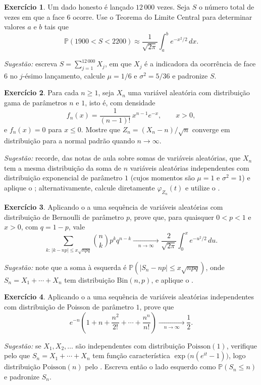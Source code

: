 \documentclass[12pt,portuguese]{article}
\theoremstyle{definition}
\theoremstyle{plainexercise}
\newtheorem{exercise}{Exercício}
\theoremstyle{starredexercise}
\theoremstyle{definition}
\begin{document}
\begin{exercise}\label{exercise:gw-8-32}
Um dado honesto é lançado $12\,000$ vezes. Seja $S$ o número total de vezes em
que a face $6$ ocorre. Use o Teorema do Limite Central para determinar valores
$a$ e $b$ tais que
\[
  \mathbb{P}(1900<S<2200)
  \approx\frac{1}{\sqrt{2\pi}}\int_a^b e^{-x^2/2}\,dx.
\]

\noindent\emph{Sugestão:} escreva $S=\sum_{j=1}^{12\,000}X_j$, em que $X_j$ é a
indicadora da ocorrência de face $6$ no $j$-ésimo lançamento, calcule $\mu=1/6$ e
$\sigma^2=5/36$ e padronize $S$.
\end{exercise}

\begin{exercise}\label{exercise:gw-8-33}
Para cada $n\geqslant1$, seja $X_n$ uma variável aleatória com distribuição
gama de parâmetros $n$ e $1$, isto é, com densidade
\[
  f_n(x)=\frac{1}{(n-1)!}\,x^{n-1}e^{-x},\qquad x>0,
\]
e $f_n(x)=0$ para $x\leqslant0$. Mostre que $Z_n=(X_n-n)/\sqrt{n}$ converge em
distribuição para a normal padrão quando $n\to\infty$.

\noindent\emph{Sugestão:} recorde, das notas de aula sobre somas de variáveis
aleatórias, que $X_n$ tem a mesma distribuição da soma de $n$ variáveis
aleatórias independentes com distribuição exponencial de parâmetro $1$ (cujos
momentos são $\mu=1$ e $\sigma^2=1$) e aplique o ;
alternativamente, calcule diretamente $\varphi_{Z_n}(t)$ e utilize o
.
\end{exercise}

\begin{exercise}\label{exercise:gw-8-prob-2}
Aplicando o  a uma sequência de variáveis aleatórias com
distribuição de Bernoulli de parâmetro $p$, prove que, para quaisquer $0<p<1$
e $x>0$, com $q=1-p$, vale
\[
  \sum_{k:\,|k-np|\leqslant x\sqrt{npq}}\binom{n}{k}p^k q^{n-k}
  \xrightarrow[\quad n\to\infty\quad]{}
  \frac{2}{\sqrt{2\pi}}\int_0^x e^{-u^2/2}\,du.
\]

\noindent\emph{Sugestão:} note que a soma à esquerda é $\mathbb{P}(|S_n-np|\leqslant x\sqrt{npq})$,
onde $S_n=X_1+\cdots+X_n$ tem distribuição $\mathrm{Bin}(n,p)$, e aplique o
.
\end{exercise}

\begin{exercise}\label{exercise:gw-8-prob-5}
Aplicando o  a uma sequência de variáveis aleatórias
independentes com distribuição de Poisson de parâmetro $1$, prove que
\[
  e^{-n}\left(1+n+\frac{n^2}{2!}+\cdots+\frac{n^n}{n!}\right)
  \xrightarrow[\quad n\to\infty\quad]{}\frac{1}{2}.
\]

\noindent\emph{Sugestão:} se $X_1,X_2,\ldots$ são independentes com distribuição
$\mathrm{Poisson}(1)$, verifique pelo  que
$S_n=X_1+\cdots+X_n$ tem função característica $\exp\bigl(n(e^{it}-1)\bigr)$,
logo distribuição $\mathrm{Poisson}(n)$ pelo . Escreva então o lado
esquerdo como $\mathbb{P}(S_n\leqslant n)$ e padronize $S_n$.
\end{exercise}
\end{document}
